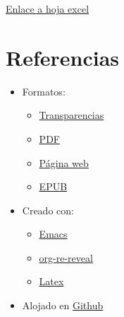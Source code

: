 \documentclass[a4paper]{article}
\begin{document}
\href{ed-0-contenidos-criterios-evaluacion.xlsx}{Enlace a hoja excel}
\section{Referencias}
\label{sec:org0000030}
\label{}
\begin{itemize}
\item Formatos:
\begin{itemize}
\item \href{./ed-0-contenidos-criterios-evaluacion.reveal.html}{Transparencias}
\item \href{./ed-0-contenidos-criterios-evaluacion.pdf}{PDF}
\item \href{./ed-0-contenidos-criterios-evaluacion.wp.html}{Página web}
\item \href{./ed-0-contenidos-criterios-evaluacion.epub}{EPUB}
\end{itemize}
\item Creado con:
\begin{itemize}
\item \href{https://www.gnu.org/s/emacs/}{Emacs}
\item \href{https://gitlab.com/oer/org-re-reveal}{org-re-reveal}
\item \href{https://www.latex-project.org/}{Latex}
\end{itemize}
\item Alojado en \href{https://alvarogonzalezsotillo.github.io/apuntes-clase}{Github}
\end{itemize}
\end{document}
